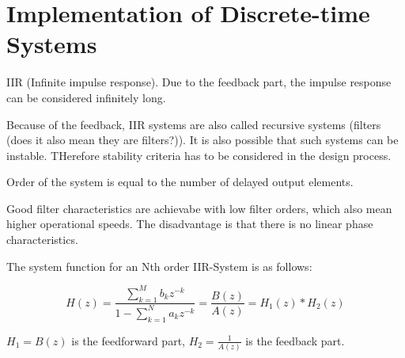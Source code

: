 \section{Implementation of Discrete-time Systems}

IIR (Infinite impulse response). Due to the feedback part, the impulse response can be considered infinitely long.

Because of the feedback, IIR systems are also called recursive systems (filters (does it also mean they are filters?)). It is also possible that such systems can be instable. THerefore stability criteria has to be considered in the design process.

Order of the system is equal to the number of delayed output elements.

Good filter characteristics are achievabe with low filter orders, which also mean higher operational speeds. The disadvantage is that there is no linear phase characteristics.

The system function for an Nth order IIR-System is as follows:

$$
\boxed{H(z) = \frac{\displaystyle \sum_{k=1}^{M}b_kz^{-k}}{\displaystyle 1-\sum_{k=1}^{N}a_kz^{-k}} = \frac{B(z)}{A(z)} = H_1(z)*H_2(z)}
$$

$H_1 = B(z)$ is the feedforward part, $H_2 = \frac{1}{A(z)}$ is the feedback part.
